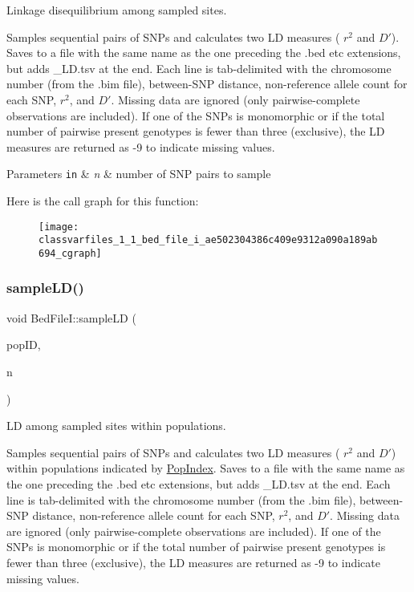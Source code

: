 Linkage disequilibrium among sampled sites. 

Samples sequential pairs of S\+N\+Ps and calculates two LD measures ( $ r^2 $ and $ D' $). Saves to a file with the same name as the one preceding the .bed etc extensions, but adds \+\_\+\+L\+D.\+tsv at the end. Each line is tab-\/delimited with the chromosome number (from the .bim file), between-\/\+S\+NP distance, non-\/reference allele count for each S\+NP, $ r^2 $, and $ D' $. Missing data are ignored (only pairwise-\/complete observations are included). If one of the S\+N\+Ps is monomorphic or if the total number of pairwise present genotypes is fewer than three (exclusive), the LD measures are returned as -\/9 to indicate missing values.


\begin{DoxyParams}[1]{Parameters}
\mbox{\tt in}  & {\em n} & number of S\+NP pairs to sample \\
\hline
\end{DoxyParams}
Here is the call graph for this function\+:\nopagebreak
\begin{figure}[H]
\begin{center}
\leavevmode
\texttt{[image: classvarfiles\_1\_1\_bed\_file\_i\_ae502304386c409e9312a090a189ab694\_cgraph]}
\end{center}
\end{figure}
\mbox{\label{classvarfiles_1_1_bed_file_i_aca4f3b7ba7fa45b6a0ed1341606858f1}} 
\subsubsection{\texorpdfstring{sample\+L\+D()}{sampleLD()}\hspace{0.1cm}{\footnotesize\ttfamily [2/2]}}
{\footnotesize\ttfamily void Bed\+File\+I\+::sample\+LD (\begin{DoxyParamCaption}\item[{const \hyperlink{classvarfiles_1_1_pop_index}{Pop\+Index} \&}]{pop\+ID,  }\item[{const uint64\+\_\+t \&}]{n }\end{DoxyParamCaption})}



LD among sampled sites within populations. 

Samples sequential pairs of S\+N\+Ps and calculates two LD measures ( $ r^2 $ and $ D' $) within populations indicated by {\ttfamily \hyperlink{classvarfiles_1_1_pop_index}{Pop\+Index}}. Saves to a file with the same name as the one preceding the .bed etc extensions, but adds \+\_\+\+L\+D.\+tsv at the end. Each line is tab-\/delimited with the chromosome number (from the .bim file), between-\/\+S\+NP distance, non-\/reference allele count for each S\+NP, $ r^2 $, and $ D' $. Missing data are ignored (only pairwise-\/complete observations are included). If one of the S\+N\+Ps is monomorphic or if the total number of pairwise present genotypes is fewer than three (exclusive), the LD measures are returned as -\/9 to indicate missing values.


